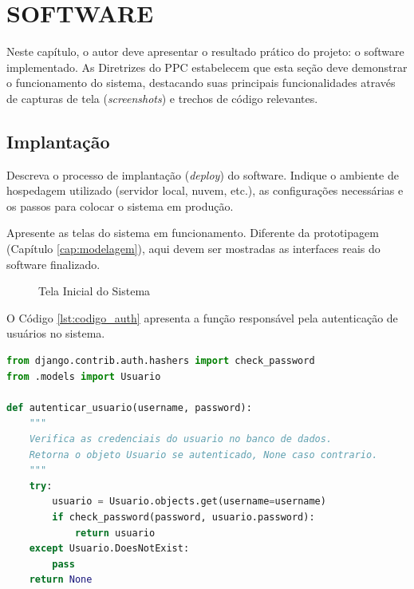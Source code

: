 \chapter{SOFTWARE}
\label{cap:software}

Neste capítulo, o autor deve apresentar o resultado prático do projeto: o software implementado. As Diretrizes do PPC estabelecem que esta seção deve demonstrar o funcionamento do sistema, destacando suas principais funcionalidades através de capturas de tela (\textit{screenshots}) e trechos de código relevantes.

\section{Implantação}

Descreva o processo de implantação (\textit{deploy}) do software. Indique o ambiente de hospedagem utilizado (servidor local, nuvem, etc.), as configurações necessárias e os passos para colocar o sistema em produção.

Apresente as telas do sistema em funcionamento. Diferente da prototipagem (Capítulo \ref{cap:modelagem}), aqui devem ser mostradas as interfaces reais do software finalizado.

\begin{figure}[htb]
\centering
\caption{Tela Inicial do Sistema}
\label{fig:tela_inicial}
\end{figure}

O Código \ref{lst:codigo_auth} apresenta a função responsável pela autenticação de usuários no sistema.

\begin{lstlisting}[language=Python, caption={Função de autenticação de usuários}, label={lst:codigo_auth}]
from django.contrib.auth.hashers import check_password
from .models import Usuario

def autenticar_usuario(username, password):
    """
    Verifica as credenciais do usuario no banco de dados.
    Retorna o objeto Usuario se autenticado, None caso contrario.
    """
    try:
        usuario = Usuario.objects.get(username=username)
        if check_password(password, usuario.password):
            return usuario
    except Usuario.DoesNotExist:
        pass
    return None
\end{lstlisting}

